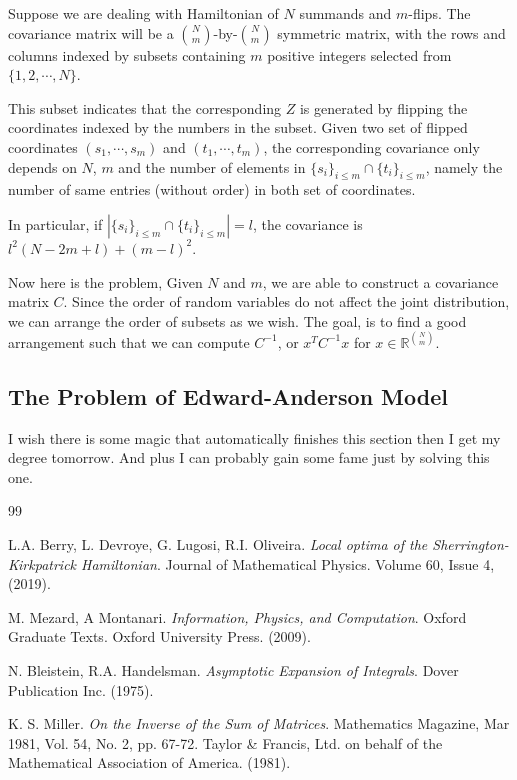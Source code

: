 \documentclass[10pt]{article}
\newenvironment{Proof of lemma}{\noindent{\bf Proof of Lemma}}{\hfill$\Box$\newline}
\newenvironment{Proof of claim}{\noindent{\bf Proof of claim}}{\hfill$\Box$\newline}
\newenvironment{Proof of theorem}{\noindent{\bf Proof of Theorem}}{\hfill\scriptsize{$\Box$}\newline}
\newenvironment{Proof of theorems}{\noindent{\bf Proof of Theorems}}{\hfill$\Box$\newline}
\newenvironment{Proof of proposition}{\noindent{\bf Proof of Proposition}}{\hfill$\Box$\newline}
\newenvironment{Proof of propositions}{\noindent{\bf Proof of Propositions}}{\hfill$\Box$\newline}
\newenvironment{Proof of exercise}{\noindent{\it Proof of Exercise:}}{\hfill$\Box$}
\numberwithin{equation}{section}
\begin{document}
Suppose we are dealing with Hamiltonian of $N$ summands and $m$-flips. The covariance matrix will be a $\binom{N}{m}$-by-$\binom{N}{m}$ symmetric matrix, with the rows and columns indexed by subsets containing $m$ positive integers selected from $\{1,2,\cdots,N\}$. 

This subset indicates that the corresponding $Z$ is generated by flipping the coordinates indexed by the numbers in the subset. Given two set of flipped coordinates $(s_1,\cdots,s_m)$ and $(t_1,\cdots,t_m)$, the corresponding covariance only depends on $N$, $m$ and the number of elements in $\{s_i\}_{i \leq m} \cap \{t_i\}_{i \leq m}$, namely the number of same entries (without order) in both set of coordinates. 

In particular, if $|\{s_i\}_{i \leq m} \cap \{t_i\}_{i \leq m}| = l$, the covariance is $l^2(N-2m+l) + (m-l)^2$.

Now here is the problem, Given $N$ and $m$, we are able to construct a covariance matrix $C$. Since the order of random variables do not affect the joint distribution, we can arrange the order of subsets as we wish. The goal, is to find a good arrangement such that we can compute $C^{-1}$, or $x^T C^{-1} x$ for $x \in \mathbb{R}^{\binom{N}{m}}$.
\subsection{The Problem of Edward-Anderson Model}
I wish there is some magic that automatically finishes this section then I get my degree tomorrow. And plus I can probably gain some fame just by solving this one.
\begin{thebibliography}{99}

L.A. Berry, L. Devroye, G. Lugosi, R.I. Oliveira. \textit{Local optima of the Sherrington-Kirkpatrick Hamiltonian}. Journal of Mathematical Physics. Volume 60, Issue 4, (2019).

 M. Mezard, A Montanari. \textit{Information, Physics, and Computation}. Oxford Graduate Texts. Oxford University Press. (2009).

 N. Bleistein, R.A. Handelsman. \textit{Asymptotic Expansion of Integrals}. Dover Publication Inc. (1975).

 K. S. Miller. \textit{On the Inverse of the Sum of Matrices}. Mathematics Magazine, Mar 1981, Vol. 54, No. 2, pp. 67-72. Taylor \& Francis, Ltd. on behalf of the Mathematical Association of America. (1981).
\end{thebibliography}
\end{document}
